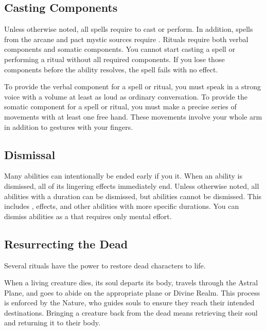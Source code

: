   \subsection{Casting Components}\label{Casting Components}
    Unless otherwise noted, all spells require  to cast or perform.
    In addition, spells from the arcane and pact mystic sources require .
    Rituals require both verbal components and somatic components.
    You cannot start casting a spell or performing a ritual without all required components.
    If you lose those components before the ability resolves, the spell fails with no effect.

    To provide the verbal component for a spell or ritual, you must speak in a strong voice with a volume at least as loud as ordinary conversation.
    To provide the somatic component for a spell or ritual, you must make a precise series of movements with at least one free hand.
    These movements involve your whole arm in addition to gestures with your fingers.

  \subsection{Dismissal}\label{Dismissal}
    Many abilities can intentionally be ended early if you  it.
    When an ability is dismissed, all of its lingering effects immediately end.
    Unless otherwise noted, all \magical abilities with a duration can be dismissed, but  abilities cannot be dismissed.
    This includes ,  effects, and other abilities with more specific durations.
    You can dismiss abilities as a  that requires only mental effort.

  \subsection{Resurrecting the Dead}\label{Resurrecting the Dead}
    Several rituals have the power to restore dead characters to life.

    When a living creature dies, its soul departs its body, travels through the Astral Plane, and goes to abide on the appropriate plane or Divine Realm.
    This process is enforced by the Nature, who guides souls to ensure they reach their intended destinations.
    Bringing a creature back from the dead means retrieving their soul and returning it to their body.

